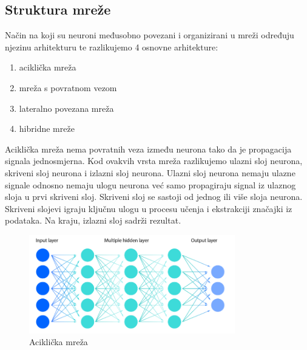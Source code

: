 \subsection{Struktura mreže}\label{subsec:struktura-mreze}
Način na koji su neuroni međusobno povezani i organizirani u mreži određuju njezinu arhitekturu te razlikujemo 4 osnovne arhitekture:

\begin{enumerate}
    \item aciklička mreža
    \item mreža s povratnom vezom
    \item lateralno povezana mreža
    \item hibridne mreže
\end{enumerate}

Aciklička mreža nema povratnih veza između neurona tako da je propagacija signala jednosmjerna.
Kod ovakvih vrsta mreža razlikujemo ulazni sloj neurona, skriveni sloj neurona i izlazni sloj neurona.
Ulazni sloj neurona nemaju ulazne signale odnosno nemaju ulogu neurona već samo propagiraju signal iz ulaznog sloja u prvi skriveni sloj.
Skriveni sloj se sastoji od jednog ili više sloja neurona.
Skriveni slojevi igraju ključnu ulogu u procesu učenja i ekstrakciji značajki iz podataka.
Na kraju, izlazni sloj sadrži rezultat.
\FloatBarrier
\begin{figure}[h]
    \centering
    \includegraphics[width=0.8\textwidth]{images/nn-arch}
    \caption{Aciklička mreža
    \protect\footnotemark}
    \label{fig:slika4}
\end{figure}
\FloatBarrier


